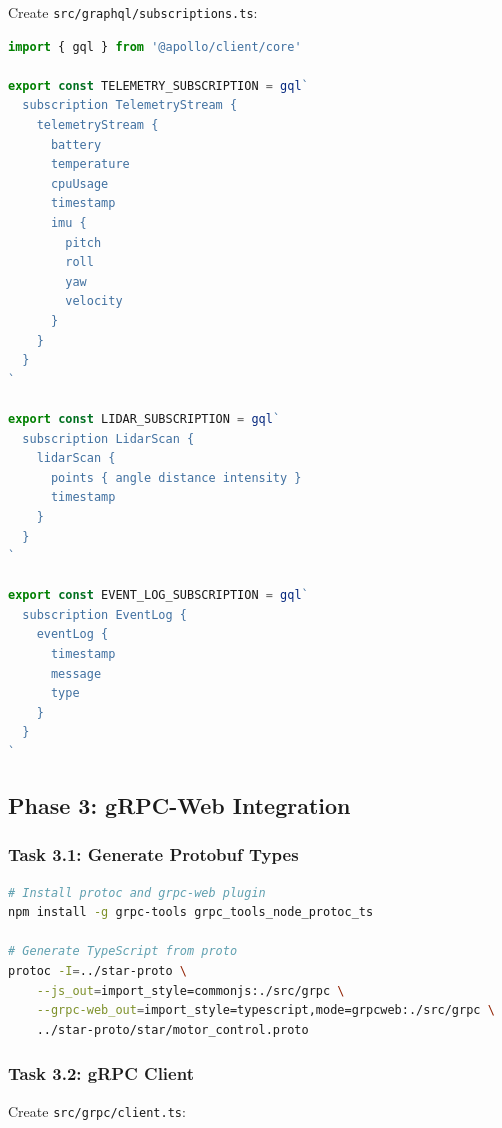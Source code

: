 Create \texttt{src/graphql/subscriptions.ts}:

\begin{lstlisting}[language=TypeScript, caption=subscriptions.ts]
import { gql } from '@apollo/client/core'

export const TELEMETRY_SUBSCRIPTION = gql`
  subscription TelemetryStream {
    telemetryStream {
      battery
      temperature
      cpuUsage
      timestamp
      imu {
        pitch
        roll
        yaw
        velocity
      }
    }
  }
`

export const LIDAR_SUBSCRIPTION = gql`
  subscription LidarScan {
    lidarScan {
      points { angle distance intensity }
      timestamp
    }
  }
`

export const EVENT_LOG_SUBSCRIPTION = gql`
  subscription EventLog {
    eventLog {
      timestamp
      message
      type
    }
  }
`
\end{lstlisting}

\subsection{Phase 3: gRPC-Web Integration}

\subsubsection{Task 3.1: Generate Protobuf Types}

\begin{lstlisting}[language=bash]
# Install protoc and grpc-web plugin
npm install -g grpc-tools grpc_tools_node_protoc_ts

# Generate TypeScript from proto
protoc -I=../star-proto \
    --js_out=import_style=commonjs:./src/grpc \
    --grpc-web_out=import_style=typescript,mode=grpcweb:./src/grpc \
    ../star-proto/star/motor_control.proto
\end{lstlisting}

\subsubsection{Task 3.2: gRPC Client}

Create \texttt{src/grpc/client.ts}:

